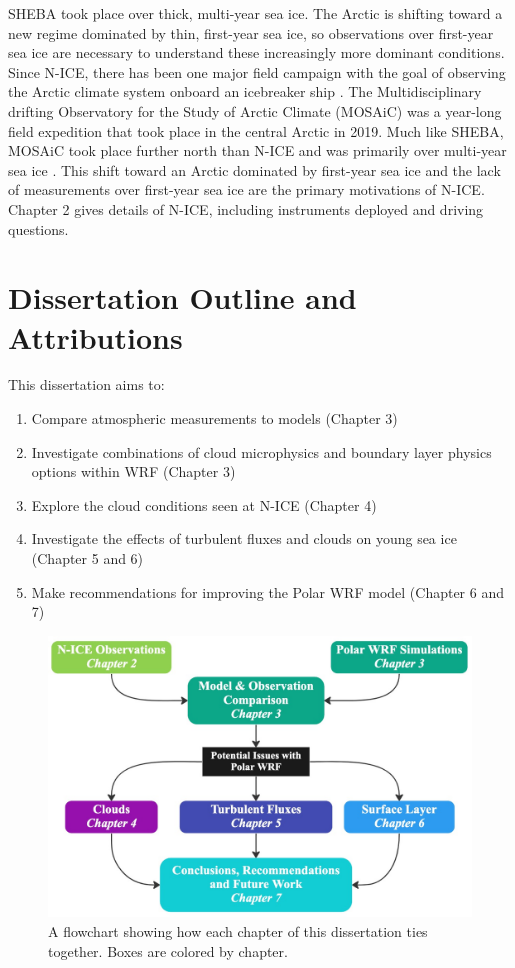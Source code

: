 SHEBA took place over thick, multi-year sea ice. The Arctic is shifting toward a new regime dominated by thin, first-year sea ice, so observations over first-year sea ice are necessary to understand these increasingly more dominant conditions. Since N-ICE, there has been one major field campaign with the goal of observing the Arctic climate system onboard an icebreaker ship \citep{shupe:2020}. The Multidisciplinary drifting Observatory for the Study of Arctic Climate (MOSAiC) was a year-long field expedition that took place in the central Arctic in 2019. Much like SHEBA, MOSAiC took place further north than N-ICE and was primarily over multi-year sea ice \citep{martin:2020}. This shift toward an Arctic dominated by first-year sea ice and the lack of measurements over first-year sea ice are the primary motivations of N-ICE. Chapter 2 gives details of N-ICE, including instruments deployed and driving questions.

\section{Dissertation Outline and Attributions}
\newline 
\noindent This dissertation aims to:
\begin{enumerate}
\item Compare atmospheric measurements to models (Chapter 3)
\item Investigate combinations of cloud microphysics and boundary layer physics options within WRF (Chapter 3)
\item Explore the cloud conditions seen at N-ICE (Chapter 4)
\item Investigate the effects of turbulent fluxes and clouds on young sea ice (Chapter 5 and 6)
\item Make recommendations for improving the Polar WRF model (Chapter 6 and 7)
\end{enumerate}

\begin{figure}[b!]
    \centering 
    \includegraphics[width=1\linewidth]{figures/flowchart.jpg}
    \caption[Flowchart of dissertation chapters.]{A flowchart showing how each chapter of this dissertation ties together. Boxes are colored by chapter.}
    \label{fig:flowchart}
\end{figure}

